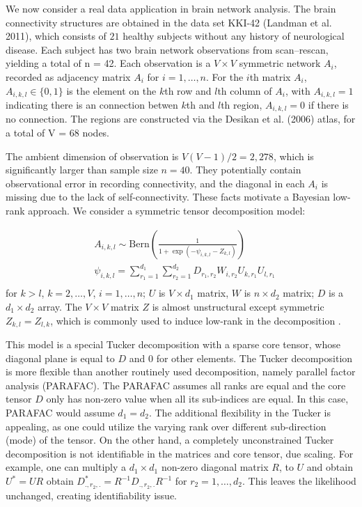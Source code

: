 \documentclass[10pt]{article}
\DeclareMathOperator{\1}{\mathbbm{1}}
\begin{document}
We now consider a real data application in brain network analysis. The brain connectivity structures are obtained in the data set KKI-42 (Landman et al. 2011), which consists of $21$ healthy subjects without any history of neurological disease. Each subject has two brain network observations from scan--rescan, yielding a total of n = 42. Each observation is a $V\times V$ symmetric network $A_i$, recorded as adjacency matrix $A_i$ for $i=1,\ldots,n$. For the $i$th matrix $A_i$, $A_{i,k,l} \in \{0,1\}$ is the element on the $k$th row and $l$th column of $A_i$, with $A_{i,k,l}=1$ indicating there is an connection betwen $k$th and $l$th region, $A_{i,k,l}=0$ if there is no connection. The regions are constructed via the Desikan et al. (2006) atlas, for a total of V = 68 nodes.

The ambient dimension of observation is $V(V-1)/2=2,278$, which is significantly larger than sample size $n=40$. They potentially contain observational error in recording connectivity, and the  diagonal in each $A_{i}$ is missing due to the lack of self-connectivity. These facts motivate a Bayesian low-rank approach. We consider a symmetric tensor decomposition model:

\begin{equation*}
\begin{aligned}
& A_{i,k,l} \sim \text{Bern}( \frac{1}{1+ \exp(-\psi_{i,k,l}- Z_{k,l})})\\
& \psi_{i,k,l} = \sum_{r_1=1}^{d_1}\sum_{r_2=1}^{d_2} D_{r_1,r_2} W_{i,r_2} U_{k,r_1} U_{l,r_1}  \\
\end{aligned}
\end{equation*}
for $k>l$, $k=2,\ldots, V$, $i=1,\ldots,n$; $U$ is $V\times d_1$ matrix, $W$ is $n\times d_2$ matrix; $D$ is a $d_1\times d_2$ array. The  $V\times V$ matrix $Z$ is almost unstructural except symmetric $Z_{k,l}=Z_{l,k}$, which is commonly used to induce low-rank in the decomposition \citep{durante2016nonparametric}.


This model is a special Tucker decomposition with a sparse core tensor, whose diagonal plane is equal to $D$ and $0$ for other elements. The Tucker decomposition is more flexible than another routinely used decomposition, namely parallel factor analysis (PARAFAC). The PARAFAC assumes all ranks are equal and the core tensor $D$ only has non-zero value when all its sub-indices are equal. In this case, PARAFAC would assume $d_1=d_2$. The additional flexibility in the Tucker is appealing, as one could utilize the varying rank over different sub-direction (mode) of the tensor. On the other hand, a completely unconstrained Tucker decomposition is not identifiable in the matrices and core tensor, due scaling. For example, one can multiply a $d_1\times d_1$ non-zero diagonal matrix $R$, to $U$ and obtain $U^*=UR$ obtain $D^{*}_{.,r_2,.}=R^{-1}D_{.,r_2,.}R^{-1}$ for $r_2=1,\ldots,d_2$. This leaves the likelihood unchanged, creating identifiability issue. 
\end{document}
